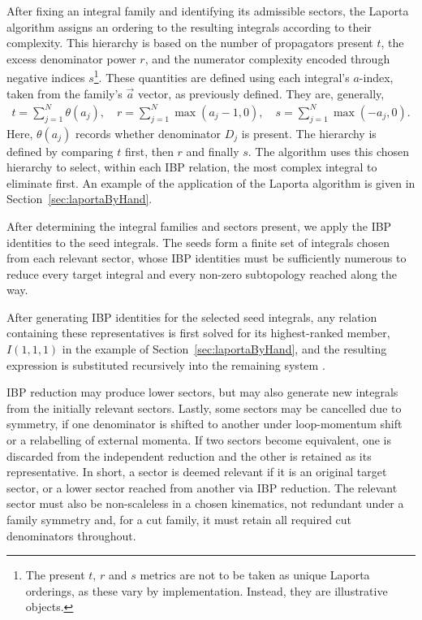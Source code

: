 After fixing an integral family and identifying its admissible sectors, the Laporta 
algorithm assigns an ordering to the resulting integrals according to their complexity. 
This hierarchy is based on the number of propagators present $t$, the excess 
denominator power $r$, and the numerator complexity encoded through negative indices
$s$\footnote{The present $t$, $r$ and $s$ metrics are not to be taken as unique 
Laporta orderings, as these vary by implementation. Instead, they are illustrative 
objects.}. These quantities are defined using each integral's $a$-index, taken from the 
family's $\vec a$ vector, as previously defined. They are, generally,
\begin{gather}
    t=\sum_{j=1}^N\theta(a_j),\quad
    r=\sum_{j=1}^N\max(a_j-1,0),\quad
    s=\sum_{j=1}^N\max(-a_j,0).
\end{gather}
Here, $\theta(a_j)$ records whether denominator $D_j$ is present. The hierarchy is defined 
by comparing $t$ first, then $r$ and finally $s$. The algorithm uses 
this chosen hierarchy to select, within each IBP relation, the most complex integral 
to eliminate first.
An example of the application of the Laporta algorithm is given
in 
Section~\ref{sec:laportaByHand}.

After determining the integral families and sectors present, we apply the IBP 
identities to the seed integrals. The seeds form a finite set of integrals chosen from each relevant sector, whose IBP identities must be sufficiently numerous to reduce every target integral 
and every non-zero subtopology reached along the way.

After generating IBP identities for the selected seed integrals, any relation 
containing these representatives is first solved for its highest-ranked member, $I(1,1,1)$ 
in the example of Section~\ref{sec:laportaByHand}, and the resulting expression is substituted recursively into the remaining 
system \cite{Laporta:2000dsw}.

IBP reduction may produce lower sectors, but
may also generate new integrals from the initially relevant sectors.
Lastly, some sectors may be cancelled due to
symmetry, if one denominator is shifted to another under loop-momentum shift or a 
relabelling of external momenta. If two sectors become equivalent, 
one is discarded from the independent reduction and the other is retained as its 
representative. In short, a sector is deemed relevant if it is an original target sector,
or a lower sector reached from another via IBP reduction. The relevant sector 
must also be non-scaleless in a chosen kinematics, not redundant under a family 
symmetry and, for a cut family, it must retain all required cut denominators throughout.

